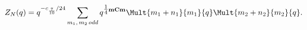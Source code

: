 \begin{equation}
Z_N(q) = q^{-c_{\frac{7}{10}}/24}
\sum_{
m_1,\,
m_2\,odd}
q^{\tfrac{1}{4}\bf{m}C\bf{m}}
\Mult{m_1+n_1}{m_1}{q}\Mult{m_2+n_2}{m_2}{q}.
\end{equation}


